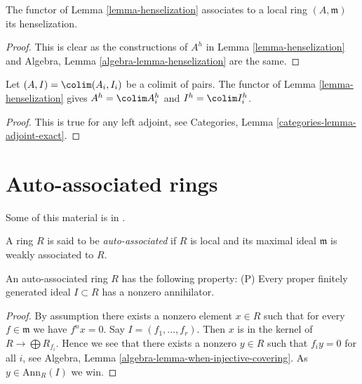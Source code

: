 \begin{lemma}
\label{lemma-henselization-local-ring}
The functor of Lemma \ref{lemma-henselization} associates to a local ring
$(A, \mathfrak m)$ its henselization.
\end{lemma}

\begin{proof}
This is clear as the constructions of $A^h$ in Lemma \ref{lemma-henselization}
and Algebra, Lemma \ref{algebra-lemma-henselization}
are the same.
\end{proof}

\begin{lemma}
\label{lemma-henselization-colimit}
Let $(A, I) = \colim (A_i, I_i)$ be a colimit of pairs. The functor of
Lemma \ref{lemma-henselization} gives
$A^h = \colim A_i^h$ and $I^h = \colim I_i^h$.
\end{lemma}

\begin{proof}
This is true for any left adjoint, see
Categories, Lemma \ref{categories-lemma-adjoint-exact}.
\end{proof}





\section{Auto-associated rings}
\label{section-auto-ass}

\noindent
Some of this material is in \cite{Autour}.

\begin{definition}
\label{definition-auto-ass}
A ring $R$ is said to be {\it auto-associated} if $R$ is local and its
maximal ideal $\mathfrak m$ is weakly associated to $R$.
\end{definition}

\begin{lemma}
\label{lemma-auto-ass-implies-P}
An auto-associated ring $R$ has the following property: (P)
Every proper finitely generated ideal $I \subset R$ has a nonzero
annihilator.
\end{lemma}

\begin{proof}
By assumption there exists a nonzero element $x \in R$ such that for every
$f \in \mathfrak m$ we have $f^n x = 0$. Say $I = (f_1, \ldots, f_r)$.
Then $x$ is in the kernel of $R \to \bigoplus R_{f_i}$. Hence we see
that there exists a nonzero $y \in R$ such that $f_i y = 0$ for all $i$, see
Algebra, Lemma \ref{algebra-lemma-when-injective-covering}.
As $y \in \text{Ann}_R(I)$ we win.
\end{proof}

